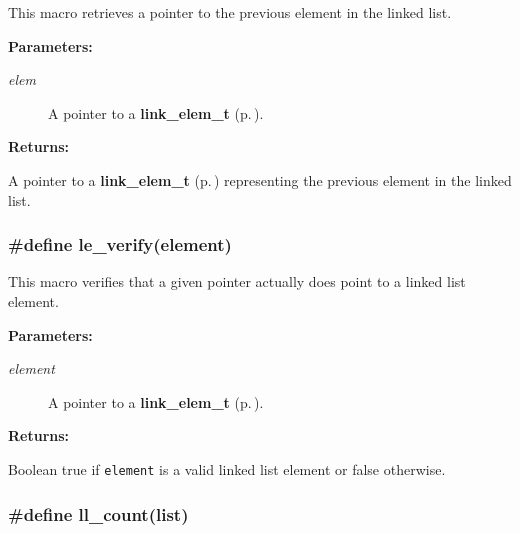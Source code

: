  This macro retrieves a pointer to the previous element in the linked list.\begin{Desc}
\item[{\bf Parameters: }]\par
\begin{description}
\item[
{\em elem}]A pointer to a {\bf link\_\-elem\_\-t} {\rm (p.\,\pageref{group__dbprim__link_a1})}.

\end{description}
\end{Desc}
\begin{Desc}
\item[{\bf Returns: }]\par
A pointer to a {\bf link\_\-elem\_\-t} {\rm (p.\,\pageref{group__dbprim__link_a1})} representing the previous element in the linked list. \end{Desc}
\subsubsection{\setlength{\rightskip}{0pt plus 5cm}\#define le\_\-verify(element)}\label{group__dbprim__link_a20}




 This macro verifies that a given pointer actually does point to a linked list element.\begin{Desc}
\item[{\bf Parameters: }]\par
\begin{description}
\item[
{\em element}]A pointer to a {\bf link\_\-elem\_\-t} {\rm (p.\,\pageref{group__dbprim__link_a1})}.

\end{description}
\end{Desc}
\begin{Desc}
\item[{\bf Returns: }]\par
Boolean true if {\tt element} is a valid linked list element or false otherwise. \end{Desc}
\subsubsection{\setlength{\rightskip}{0pt plus 5cm}\#define ll\_\-count(list)}\label{group__dbprim__link_a15}




